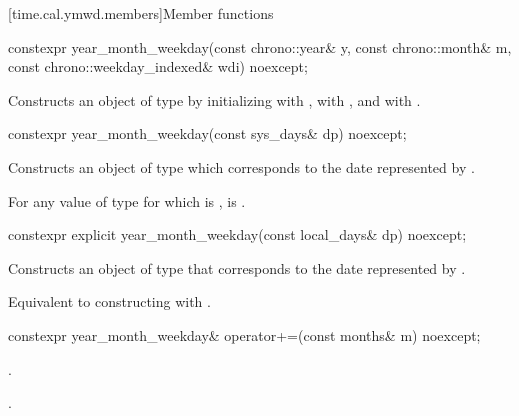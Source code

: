 [time.cal.ymwd.members]{Member functions}

%
\begin{itemdecl}
constexpr year_month_weekday(const chrono::year& y, const chrono::month& m,
                             const chrono::weekday_indexed& wdi) noexcept;
\end{itemdecl}

\begin{itemdescr}
\pnum
\effects
Constructs an object of type  by
initializing  with ,  with , and  with .
\end{itemdescr}

%
\begin{itemdecl}
constexpr year_month_weekday(const sys_days& dp) noexcept;
\end{itemdecl}

\begin{itemdescr}
\pnum
\effects
Constructs an object of type 
which corresponds to the date represented by .

\pnum
\remarks
For any value  of type 
for which  is ,
 is .
\end{itemdescr}

%
\begin{itemdecl}
constexpr explicit year_month_weekday(const local_days& dp) noexcept;
\end{itemdecl}

\begin{itemdescr}
\pnum
\effects
Constructs an object of type 
that corresponds to the date represented by .

\pnum
\remarks
Equivalent to constructing with .
\end{itemdescr}

%
\begin{itemdecl}
constexpr year_month_weekday& operator+=(const months& m) noexcept;
\end{itemdecl}

\begin{itemdescr}
\pnum
\effects
{}.

\pnum
\returns
{}.
\end{itemdescr}

